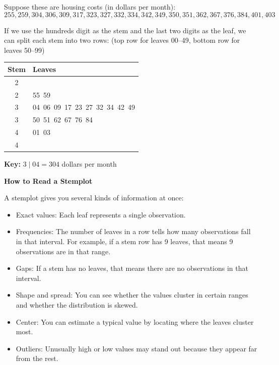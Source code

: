 \begin{Worked}
\begin{Problem}
Suppose these are housing costs (in dollars per month):
\[
255, 259, 304, 306, 309, 317, 323, 327, 332, 334, 342, 349, 350, 351, 362, 367, 376, 384, 401, 403
\]
\end{Problem}
\begin{Solution}
If we use the hundreds digit as the stem and the last two digits as the leaf, we can split each stem into two rows:
(top row for leaves 00--49, bottom row for leaves 50--99)

\begin{center}
\begin{tabular}{c | l}
Stem & Leaves \\
\hline
2 &  \\
2 & 55\ 59 \\
3 & 04\ 06\ 09\ 17\ 23\ 27\ 32\ 34\ 42\ 49 \\
3 & 50\ 51\ 62\ 67\ 76\ 84 \\
4 & 01\ 03 \\
4 &  \\
\end{tabular}
\end{center}

\textbf{Key:} $3 \mid 04 = 304$ dollars per month
\end{Solution}
\end{Worked}

\textbf{How to Read a Stemplot}

A stemplot gives you several kinds of information at once:
\begin{itemize}
    \item Exact values: Each leaf represents a single observation.
    \item Frequencies: The number of leaves in a row tells how many observations fall in that interval.
    For example, if a stem row has 9 leaves, that means 9 observations are in that range.
    \item Gaps: If a stem has no leaves, that means there are no observations in that interval.
    \item Shape and spread: You can see whether the values cluster in certain ranges and whether the distribution is skewed.
    \item Center: You can estimate a typical value by locating where the leaves cluster most.
    \item Outliers: Unusually high or low values may stand out because they appear far from the rest.
\end{itemize}

